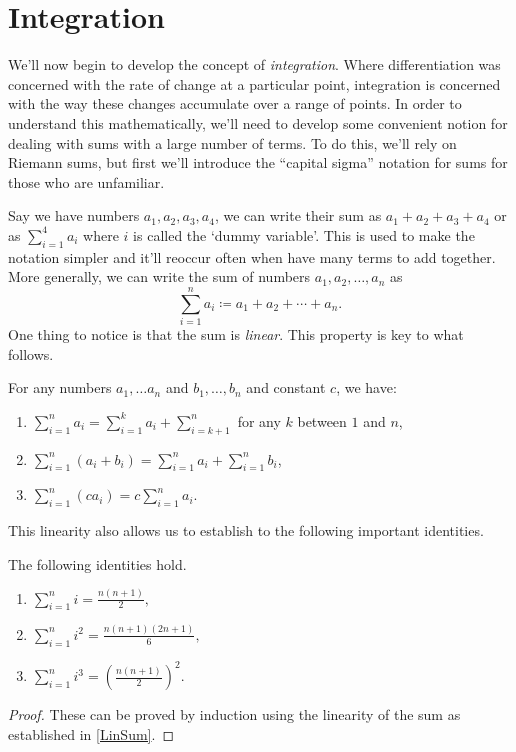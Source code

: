 \section{Integration}

We'll now begin to develop the concept of \emph{integration}. Where differentiation was concerned with the rate of change at a particular point, integration is concerned with the way these changes accumulate over a range of points. In order to understand this mathematically, we'll need to develop some convenient notion for dealing with sums with a large number of terms. To do this, we'll rely on Riemann sums, but first we'll introduce the ``capital sigma'' notation for sums for those who are unfamiliar.


Say we have numbers $a_1, a_2, a_3, a_4$, we can write their sum as $a_1+a_2+a_3+a_4$ or as $\sum_{i=1}^4a_i$ where $i$ is called the `dummy variable'. This is used to make the notation simpler and it'll reoccur often when have many terms to add together. More generally, we can write the sum of numbers $a_1, a_2,\dotsc, a_n$ as
\begin{equation}
\sum_{i=1}^{n}a_i \coloneqq a_1+a_2+\dotsb+a_n.
\end{equation}
One thing to notice is that the sum is \emph{linear}. This property is key to what follows.

\begin{lem}\label{LinSum}
  For any numbers $a_1, \dotsc a_n$ and $b_1, \dotsc, b_n$ and constant $c$, we have:
  \begin{enumerate}
    \item $\sum_{i=1}^{n}a_i=\sum_{i=1}^{k}a_i+\sum_{i=k+1}^{n}$ for any $k$ between $1$ and $n$,
    \item $\sum_{i=1}^{n}(a_i+b_i)=\sum_{i=1}^{n}a_i+\sum_{i=1}^{n}b_i$,
    \item $\sum_{i=1}^{n}(ca_i)=c\sum_{i=1}^{n}a_i.$
  \end{enumerate}
\end{lem}


This linearity also allows us to establish to the following important identities.

\begin{lem}\label{IntegerSums}
  The following identities hold.
\begin{enumerate}
  \item $\sum_{i=1}^{n}i=\frac{n(n+1)}{2},$
  \item $\sum_{i=1}^{n}i^2=\frac{n(n+1)(2n+1)}{6},$
  \item $\sum_{i=1}^{n}i^3=\left(\frac{n(n+1)}{2} \right)^2.$
\end{enumerate}
\end{lem}
\begin{proof}
  These can be proved by induction using the linearity of the sum as established in \cref{LinSum}.
\end{proof}

